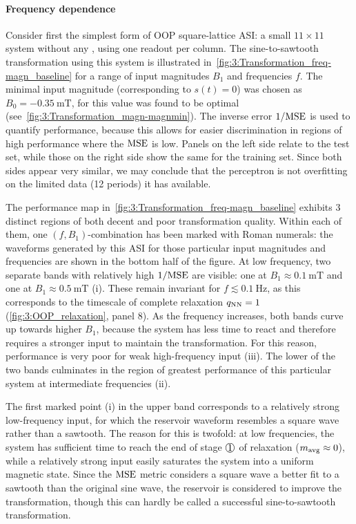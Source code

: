 \paragraph{Frequency dependence}
Consider first the simplest form of OOP square-lattice ASI: a small $11 \times 11$ system without any , using one readout per column.
The sine-to-sawtooth transformation using this system is illustrated in~\cref{fig:3:Transformation_freq-magn_baseline} for a range of input magnitudes $B_1$ and frequencies $f$.
The minimal input magnitude (corresponding to $s(t) = 0$) was chosen as $B_0 = \SI{-0.35}{\milli\tesla}$, for this value was found to be optimal (see~\cref{fig:3:Transformation_magn-magnmin}).
The inverse error $1/\mathrm{MSE}$ is used to quantify performance, because this allows for easier discrimination in regions of high performance where the $\mathrm{MSE}$ is low.
Panels on the left side relate to the test set, while those on the right side show the same for the training set.
Since both sides appear very similar, we may conclude that the perceptron is not overfitting on the limited data (12 periods) it has available. \par
The performance map in~\cref{fig:3:Transformation_freq-magn_baseline} exhibits 3 distinct regions of both decent and poor transformation quality.
Within each of them, one $(f, B_1)$-combination has been marked with Roman numerals: the waveforms generated by this ASI for those particular input magnitudes and frequencies are shown in the bottom half of the figure.
At low frequency, two separate bands with relatively high $1/\mathrm{MSE}$ are visible: one at $B_1 \approx \SI{0.1}{\milli\tesla}$  and one at $B_1 \approx \SI{0.5}{\milli\tesla}$ \textsf{(i)}.
These remain invariant for $f \lesssim \SI{0.1}{\hertz}$, as this corresponds to the timescale of complete relaxation $q_\mathrm{NN} = 1$ (\cref{fig:3:OOP_relaxation}, panel 8).
As the frequency increases, both bands curve up towards higher $B_1$, because the system has less time to react and therefore requires a stronger input to maintain the transformation.
For this reason, performance is very poor for weak high-frequency input \textsf{(iii)}.
The lower of the two bands culminates in the region of greatest performance of this particular system at intermediate frequencies \textsf{(ii)}. \par %
The first marked point \textsf{(i)} in the upper band corresponds to a relatively strong low-frequency input, for which the reservoir waveform resembles a square wave rather than a sawtooth.
The reason for this is twofold: at low frequencies, the system has sufficient time to reach the end of stage $\circled{1}$ of relaxation ($m_\mathrm{avg} \approx 0$), while a relatively strong input easily saturates the system into a uniform magnetic state. %
Since the $\mathrm{MSE}$ metric considers a square wave a better fit to a sawtooth than the original sine wave, the reservoir is considered to improve the transformation, though this can hardly be called a successful sine-to-sawtooth transformation.

